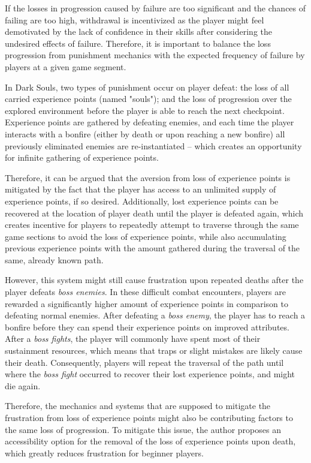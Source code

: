 If the losses in progression caused by failure are too significant and the chances of failing are too high, withdrawal is incentivized as the player might feel demotivated by the lack of confidence in their skills after considering the undesired effects of failure. Therefore, it is important to balance the loss progression from punishment mechanics with the expected frequency of failure by players at a given game segment.

In Dark Souls, two types of punishment occur on player defeat: the loss of all carried experience points (named "souls"); and the loss of progression over the explored environment before the player is able to reach the next checkpoint. Experience points are gathered by defeating enemies, and each time the player interacts with a bonfire (either by death or upon reaching a new bonfire) all previously eliminated enemies are re-instantiated -- which creates an opportunity for infinite gathering of experience points.

Therefore, it can be argued that the aversion from loss of experience points is mitigated by the fact that the player has access to an unlimited supply of experience points, if so desired. Additionally, lost experience points can be recovered at the location of player death until the player is defeated again, which creates incentive for players to repeatedly attempt to traverse through the same game sections to avoid the loss of experience points, while also accumulating previous experience points with the amount gathered during the traversal of the same, already known path.

However, this system might still cause frustration upon repeated deaths after the player defeats \emph{boss enemies}. In these difficult combat encounters, players are rewarded a significantly higher amount of experience points in comparison to defeating normal enemies. After defeating a \emph{boss enemy}, the player has to reach a bonfire before they can spend their experience points on improved attributes. After a \emph{boss fights}, the player will commonly have spent most of their sustainment resources, which means that traps or slight mistakes are likely cause their death. Consequently, players will repeat the traversal of the path until where the \emph{boss fight} occurred to recover their lost experience points, and might die again.

Therefore, the mechanics and systems that are supposed to mitigate the frustration from loss of experience points might also be contributing factors to the same loss of progression. To mitigate this issue, the author proposes an accessibility option for the removal of the loss of experience points upon death, which greatly reduces frustration for beginner players.

